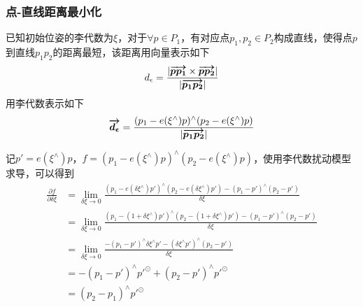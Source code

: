 \documentclass{ctexart}
\begin{document}
	\subsubsection{点-直线距离最小化}
	已知初始位姿的李代数为$\xi$，对于$\forall p \in P_1$，有对应点$p_1,p_2 \in P_2$构成直线，使得点$p$到直线$p_1p_2$的距离最短，该距离用向量表示如下
	\begin{equation}
	d_{\epsilon} =
	\frac{|\boldmath\overrightarrow{p p_1}\unboldmath \times \boldmath\overrightarrow{p p_2}\unboldmath|}{|\boldmath\overrightarrow{p_1 p_2}\unboldmath|}
	\end{equation}
	用李代数表示如下
	\begin{equation}
	\boldmath\overrightarrow{d_{\epsilon}}\unboldmath =
	\frac{(p_1-e(\xi ^\wedge)p)^\wedge(p_2-e(\xi ^\wedge)p)}{|\boldmath\overrightarrow{p_1 p_2}\unboldmath|}
	\end{equation}
	\par 记$p'=e(\xi ^\wedge)p$，$f=(p_1-e(\xi ^\wedge)p) ^\wedge (p_2-e(\xi ^\wedge)p)$，使用李代数扰动模型求导，可以得到
	\begin{equation}
	\begin{split}
	\frac{\partial f}{\partial \delta \xi}
	&=
	\lim\limits_{\delta \xi \rightarrow 0}
	\frac{(p_1-e(\delta \xi ^\wedge) p') 
	^\wedge 
	(p_2-e(\delta \xi ^\wedge) p')
	-
	(p_1-p') ^\wedge (p_2-p')
	}{\delta \xi} \\
	&=
	\lim\limits_{\delta \xi \rightarrow 0}
	\frac{(p_1-(1+\delta \xi ^\wedge) p') 
		^\wedge 
		(p_2-(1+\delta \xi ^\wedge) p')
		-
		(p_1-p') ^\wedge (p_2-p')
	}{\delta \xi} \\
	&=
	\lim\limits_{\delta \xi \rightarrow 0}
	\frac{-(p_1-p')^\wedge\delta\xi^\wedge p'- (\delta\xi^\wedge p')^\wedge(p_2-p')}{\delta \xi} \\
	&=
	- (p_1-p')^\wedge p'^\odot + (p_2-p')^\wedge p'^\odot \\
	&=
	(p_2 - p_1)^\wedge p'^\odot
	\end{split}
	\end{equation}
	
\end{document}
